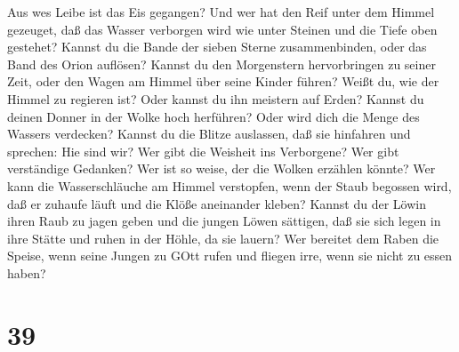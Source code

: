 Aus wes Leibe ist das Eis gegangen? Und wer hat den Reif unter dem
Himmel gezeuget,  daß das Wasser verborgen wird wie unter
Steinen und die Tiefe oben gestehet?  Kannst du die Bande
der sieben Sterne zusammenbinden, oder das Band des Orion auflösen?
 Kannst du den Morgenstern hervorbringen zu seiner Zeit,
oder den Wagen am Himmel über seine Kinder führen?  Weißt
du, wie der Himmel zu regieren ist? Oder kannst du ihn meistern auf
Erden?  Kannst du deinen Donner in der Wolke hoch
herführen? Oder wird dich die Menge des Wassers verdecken? 
Kannst du die Blitze auslassen, daß sie hinfahren und sprechen: Hie sind
wir?  Wer gibt die Weisheit ins Verborgene? Wer gibt
verständige Gedanken?  Wer ist so weise, der die Wolken
erzählen könnte? Wer kann die Wasserschläuche am Himmel verstopfen,
 wenn der Staub begossen wird, daß er zuhaufe läuft und die
Klöße aneinander kleben?  Kannst du der Löwin ihren Raub zu
jagen geben und die jungen Löwen sättigen,  daß sie sich
legen in ihre Stätte und ruhen in der Höhle, da sie lauern?
 Wer bereitet dem Raben die Speise, wenn seine Jungen zu
GOtt rufen und fliegen irre, wenn sie nicht zu essen haben?

\hypertarget{section-38}{%
\section{39}\label{section-38}}

